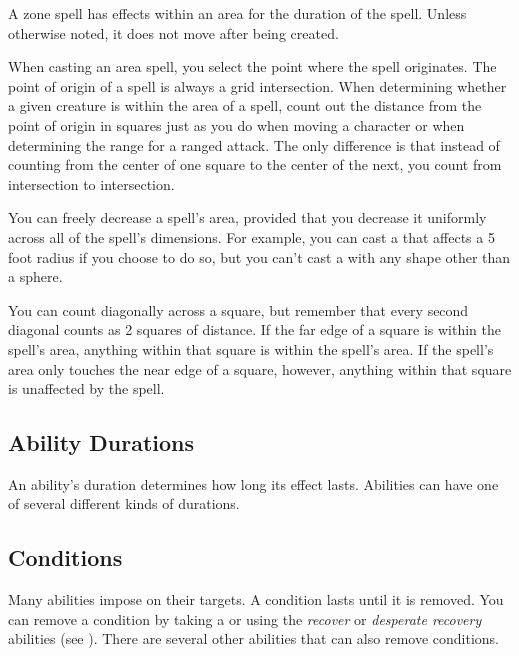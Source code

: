              A zone spell has effects within an area for the duration of the spell.
            Unless otherwise noted, it does not move after being created.


        When casting an area spell, you select the point where the spell originates.
        The point of origin of a spell is always a grid intersection.
        When determining whether a given creature is within the area of a spell, count out the distance from the point of origin in squares just as you do when moving a character or when determining the range for a ranged attack.
        The only difference is that instead of counting from the center of one square to the center of the next, you count from intersection to intersection.

        You can freely decrease a spell's area, provided that you decrease it uniformly across all of the spell's dimensions.
        For example, you can cast a  that affects a 5 foot radius if you choose to do so, but you can't cast a  with any shape other than a sphere.

        You can count diagonally across a square, but remember that every second diagonal counts as 2 squares of distance.
        If the far edge of a square is within the spell's area, anything within that square is within the spell's area.
        If the spell's area only touches the near edge of a square, however, anything within that square is unaffected by the spell.

    \subsection{Ability Durations}

        An ability's duration determines how long its effect lasts.
        Abilities can have one of several different kinds of durations.

        \subsection{Conditions}\label{Conditions}
            Many abilities impose  on their targets.
            A condition lasts until it is removed.
            You can remove a condition by taking a  or using the \textit{recover} or \textit{desperate recovery} abilities (see ).
            There are several other abilities that can also remove conditions.

